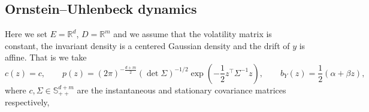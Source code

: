 \documentclass{article}
\theoremstyle{plain}
\theoremstyle{definition}
\newcommand{\R}{\mathbb{R}}
\renewcommand{\P}{\mathbb{P}}
\numberwithin{lem}{section}
\begin{document}

\subsection{Ornstein--Uhlenbeck dynamics} \label{sec:OU}

Here we set $E = \R^d$, $D = \R^m$ and we assume that the volatility matrix is constant, the invariant density is a centered Gaussian density and the drift of $y$ is affine. That is we take
\begin{equation} \label{eqn:Gaussian_inputs}
c(z) = c, \qquad p(z) = (2\pi)^{-\frac{d+m}{2}} (\det \Sigma)^{-1/2}\exp(-\frac{1}{2}z^\top \Sigma^{-1}z), \qquad b_Y(z) = \frac{1}{2}(\alpha + \beta z),
\end{equation}
where $c, \Sigma \in \mathbb{S}^{d+m}_{++}$ are the instantaneous and stationary covariance matrices respectively,
\end{document}
